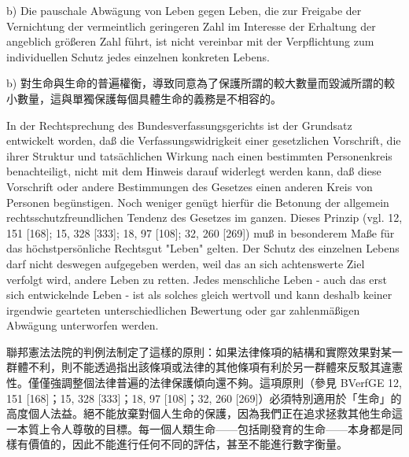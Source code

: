 \documentclass[12pt]{article}
\begin{document}
\syncleft
\begin{sourcepara}
b) Die pauschale Abwägung von Leben gegen Leben, die zur Freigabe der Vernichtung der vermeintlich geringeren Zahl im Interesse der Erhaltung der angeblich größeren Zahl führt, ist nicht vereinbar mit der Verpflichtung zum individuellen Schutz jedes einzelnen konkreten Lebens.
\end{sourcepara}
\begin{transpara}
b) 對生命與生命的普遍權衡，導致同意為了保護所謂的較大數量而毀滅所謂的較小數量，這與單獨保護每個具體生命的義務是不相容的。
\end{transpara}

\syncleft
\begin{sourcepara}
In der Rechtsprechung des Bundesverfassungsgerichts ist der Grundsatz entwickelt worden, daß die Verfassungswidrigkeit einer gesetzlichen Vorschrift, die ihrer Struktur und tatsächlichen Wirkung nach einen bestimmten Personenkreis benachteiligt, nicht mit dem Hinweis darauf widerlegt werden kann, daß diese Vorschrift oder andere Bestimmungen des Gesetzes einen anderen Kreis von Personen begünstigen. Noch weniger genügt hierfür die Betonung der allgemein rechtsschutzfreundlichen Tendenz des Gesetzes im ganzen. Dieses Prinzip (vgl. \abbrBVerfGE{} 12, 151 [168]; 15, 328 [333]; 18, 97 [108]; 32, 260 [269]) muß in besonderem Maße für das höchstpersönliche Rechtsgut "Leben" gelten. Der Schutz des einzelnen Lebens darf nicht deswegen aufgegeben werden, weil das an sich achtenswerte Ziel verfolgt wird, andere Leben zu retten. Jedes menschliche Leben - auch das erst sich entwickelnde Leben - ist als solches gleich wertvoll und kann deshalb keiner irgendwie gearteten unterschiedlichen Bewertung oder gar zahlenmäßigen Abwägung unterworfen werden.
\end{sourcepara}
\begin{transpara}
聯邦憲法法院的判例法制定了這樣的原則：如果法律條項的結構和實際效果對某一群體不利，則不能透過指出該條項或法律的其他條項有利於另一群體來反駁其違憲性。僅僅強調整個法律普遍的法律保護傾向還不夠。這項原則（參見 BVerfGE 12, 151 [168]；15, 328 [333]；18, 97 [108]；32, 260 [269]）必須特別適用於「生命」的高度個人法益。絕不能放棄對個人生命的保護，因為我們正在追求拯救其他生命這一本質上令人尊敬的目標。每一個人類生命——包括剛發育的生命——本身都是同樣有價值的，因此不能進行任何不同的評估，甚至不能進行數字衡量。
\end{transpara}
\end{document}
